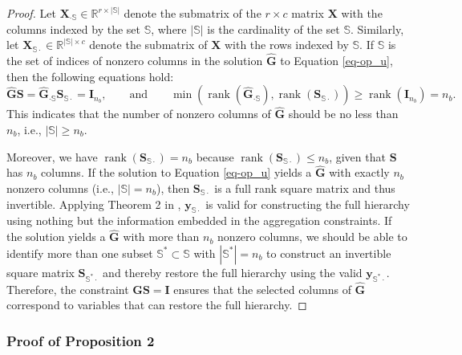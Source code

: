 \documentclass[
  11pt]{article}
\theoremstyle{plain}
\theoremstyle{remark}
\begin{document}
\begin{proof}
Let \(\bm{X}_{\cdot \mathbb{S}} \in \mathbb{R}^{r \times |\mathbb{S}|}\)
denote the submatrix of the \(r \times c\) matrix \(\bm{X}\) with the
columns indexed by the set \(\mathbb{S}\), where \(|\mathbb{S}|\) is the
cardinality of the set \(\mathbb{S}\). Similarly, let
\(\bm{X}_{\mathbb{S}\cdot} \in \mathbb{R}^{|\mathbb{S}| \times c}\)
denote the submatrix of \(\bm{X}\) with the rows indexed by
\(\mathbb{S}\). If \(\mathbb{S}\) is the set of indices of nonzero
columns in the solution \(\hat{\bm{G}}\) to Equation \eqref{eq-op_u},
then the following equations hold: \[
\hat{\bm{G}}\bm{S} = \hat{\bm{G}}_{\cdot \mathbb{S}}\bm{S}_{\mathbb{S}\cdot} = \bm{I}_{n_b},
\qquad\text{and}\qquad
\min \left(\operatorname{rank}(\hat{\bm{G}}_{\cdot \mathbb{S}}), \operatorname{rank}(\bm{S}_{\mathbb{S}\cdot})\right) \geq \operatorname{rank}(\bm{I}_{n_b})=n_b.
\] This indicates that the number of nonzero columns of \(\hat{\bm{G}}\)
should be no less than \(n_b\), i.e., \(|\mathbb{S}| \geq n_b\).

Moreover, we have
\(\operatorname{rank}(\bm{S}_{\mathbb{S}\cdot}) = n_b\) because
\(\operatorname{rank}(\bm{S}_{\mathbb{S}\cdot}) \leq n_b\), given that
\(\bm{S}\) has \(n_b\) columns. If the solution to Equation
\eqref{eq-op_u} yields a \(\hat{\bm{G}}\) with exactly \(n_b\) nonzero
columns (i.e., \(|\mathbb{S}|=n_b\)), then \(\bm{S}_{\mathbb{S}\cdot}\)
is a full rank square matrix and thus invertible. Applying Theorem 2 in
\citet{Zhang2023-op}, \(\bm{y}_{\mathbb{S}\cdot}\) is valid for
constructing the full hierarchy using nothing but the information
embedded in the aggregation constraints. If the solution yields a
\(\hat{\bm{G}}\) with more than \(n_b\) nonzero columns, we should be
able to identify more than one subset
\(\mathbb{S}^* \subset \mathbb{S}\) with \(|\mathbb{S}^*|=n_b\) to
construct an invertible square matrix \(\bm{S}_{\mathbb{S}^{*}\cdot}\)
and thereby restore the full hierarchy using the valid
\(\bm{y}_{\mathbb{S}^{*}\cdot}\). Therefore, the constraint
\(\bm{GS}=\bm{I}\) ensures that the selected columns of \(\hat{\bm{G}}\)
correspond to variables that can restore the full hierarchy.
\end{proof}

\subsubsection{Proof of Proposition 2}\label{proof-of-proposition-2}
\end{document}

